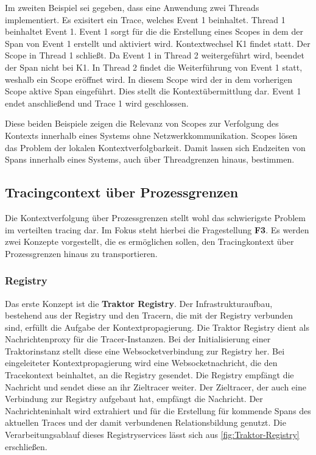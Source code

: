 Im zweiten Beispiel sei gegeben, dass eine Anwendung zwei Threads implementiert. Es exisitert ein Trace, welches Event 1 beinhaltet. Thread 1 beinhaltet Event 1. Event 1 sorgt für die die Erstellung eines Scopes in dem der Span von Event 1 erstellt und aktiviert wird. Kontextwechsel K1 findet statt. Der Scope in Thread 1 schließt. Da Event 1 in Thread 2 weitergeführt wird, beendet der Span nicht bei K1. In Thread 2 findet die Weiterführung von Event 1 statt, weshalb ein Scope eröffnet wird. In diesem Scope wird der in dem vorherigen Scope aktive Span eingeführt. Dies stellt die Kontextübermittlung dar. Event 1 endet anschließend und Trace 1 wird geschlossen.

Diese beiden Beispiele zeigen die Relevanz von Scopes zur Verfolgung des Kontexts innerhalb eines Systems ohne Netzwerkkommunikation. Scopes lösen das Problem der lokalen  Kontextverfolgbarkeit. Damit lassen sich Endzeiten von Spans innerhalb eines Systems, auch über Threadgrenzen hinaus, bestimmen. 

\subsection{Tracingcontext über Prozessgrenzen}
\label{subsection:Tracingcontext über Systemgrenzen}

Die Kontextverfolgung über Prozessgrenzen stellt wohl das schwierigste Problem im verteilten tracing dar. Im Fokus steht hierbei die Fragestellung \textbf{F3}. Es werden zwei Konzepte vorgestellt, die es ermöglichen sollen, den Tracingkontext über Prozessgrenzen hinaus zu transportieren. 


\subsubsection{Registry}
Das erste Konzept ist die \textbf{Traktor Registry}. 
Der Infrastrukturaufbau, bestehend aus der Registry und den Tracern, die mit der Registry verbunden sind, erfüllt die Aufgabe der Kontextpropagierung. Die Traktor Registry dient als Nachrichtenproxy für die Tracer-Instanzen. Bei der Initialisierung einer Traktorinstanz stellt diese eine Websocketverbindung zur Registry her. Bei eingeleiteter Kontextpropagierung wird eine Websocketnachricht, die den Tracekontext beinhaltet, an die Registry gesendet. Die Registry empfängt die Nachricht und sendet diese an ihr Zieltracer weiter. Der Zieltracer, der auch eine Verbindung zur Registry aufgebaut hat, empfängt die Nachricht. Der Nachrichteninhalt wird extrahiert und für die Erstellung für kommende Spans des aktuellen Traces und der damit verbundenen Relationsbildung genutzt. Die Verarbeitungsablauf dieses Registryservices lässt sich aus \cref{fig:Traktor-Registry} erschließen.

